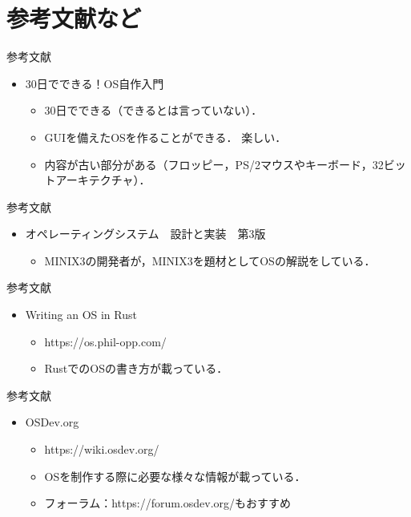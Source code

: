 \documentclass[titlepage,dvipdfmx,uplatex,a4j,12pt]{beamer}
\begin{document}
\section{参考文献など}

\begin{frame}{参考文献}
    \begin{itemize}
        \item 30日でできる！OS自作入門
            \begin{itemize}
                \item 30日でできる（できるとは言っていない）．
                \item GUIを備えたOSを作ることができる． 楽しい．
                \item 内容が古い部分がある（フロッピー，PS/2マウスやキーボード，32ビットアーキテクチャ）．
            \end{itemize}
    \end{itemize}
\end{frame}

\begin{frame}{参考文献}
    \begin{itemize}
        \item オペレーティングシステム　設計と実装　第3版
            \begin{itemize}
                \item MINIX3の開発者が，MINIX3を題材としてOSの解説をしている．
            \end{itemize}
    \end{itemize}
\end{frame}

\begin{frame}{参考文献}
    \begin{itemize}
        \item Writing an OS in Rust
            \begin{itemize}
                \item https://os.phil-opp.com/
                \item RustでのOSの書き方が載っている．
            \end{itemize}
    \end{itemize}
\end{frame}

\begin{frame}{参考文献}
    \begin{itemize}
        \item OSDev.org
            \begin{itemize}
                \item https://wiki.osdev.org/
                \item OSを制作する際に必要な様々な情報が載っている．
                \item フォーラム：https://forum.osdev.org/もおすすめ
            \end{itemize}
    \end{itemize}
\end{frame}
\end{document}
